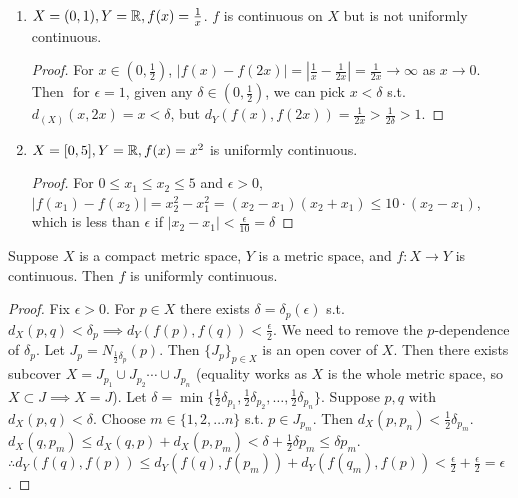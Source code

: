 \begin{example}
	\begin{enumerate}
		\item $X=(0,1), Y=\mathbb{R},f(x)=\frac{1}{x}$. $f$ is continuous on $X$ but is not uniformly continuous.
		      \begin{proof}
			      For $x \in (0,\frac{1}{2})$, $|f(x)-f(2x)|=|\frac{1}{x}-\frac{1}{2x}|=\frac{1}{2x}\to \infty$ as $x \to 0$. Then $\text{ for } \epsilon=1$, given any $\delta \in (0,\frac{1}{2})$, we can pick $x<\delta$ s.t. $d_(X)(x,2x)=x<\delta$, but $d_Y(f(x),f(2x))=\frac{1}{2x}>\frac{1}{2 \delta}>1$.
		      \end{proof}
		\item $X=[0,5], Y=\mathbb{R},f(x)=x^2$ is uniformly continuous.
		      \begin{proof}
			      For $0\le x_1\le x_2\le 5$ and $\epsilon>0$, $|f(x_1)-f(x_2)|=x_2^2-x_1^2=(x_2-x_1)(x_2+x_1)\le 10 \cdot (x_2-x_1)$, which is less than $\epsilon$ if $|x_2-x_1|<\frac{\epsilon}{10}=\delta$
		      \end{proof}
	\end{enumerate}
\end{example}

\begin{theorem}[19]
	Suppose $X$ is a compact metric space, $Y$ is a metric space, and $f:X\to Y$ is continuous. Then $f$ is uniformly continuous.
	\begin{proof}
		Fix $\epsilon>0$. For $p \in X$ there exists $\delta=\delta_p(\epsilon)$ s.t. $d_{X}(p,q)<\delta_{p}\implies d_Y(f(p),f(q))<\frac{\epsilon}{2}$.
		We need to remove the $p$-dependence of $\delta_p$.
		Let $J_{p}=N_{\frac{1}{2}\delta_{p}}(p)$. Then $\{ {J}_{p}\}_{p \in X}$ is an open cover of $X$.
		Then there exists subcover $X= J_{p_1} \cup J_{p_2}\cdots \cup J_{p_n}$ (equality works as $X$ is the whole metric space, so $X \subset J \implies X=J$).
		Let $\delta=\min\{\frac{1}{2}\delta_{p_1},\frac{1}{2}\delta_{p_2},\ldots ,\frac{1}{2}\delta_{p_n}\}$.
		Suppose $p,q$ with $d_{X}(p,q)<\delta$. Choose $m \in \{1,2,\ldots n\}$ s.t. $p \in J_{p_m}$. Then $d_{X}(p,p_{n})<\frac{1}{2}\delta_{p_{m}}$.
		$d_X(q,p_{m})\le d_X(q,p)+d_{X}(p,p_{m})<\delta+\frac{1}{2}\delta p_{m}\le \delta p_m$.
		$\therefore d_Y(f(q),f(p))\le d_Y(f(q),f(p_{m}))+d_Y(f(q_m),f(p))<\frac{\epsilon}{2}+\frac{\epsilon}{2}=\epsilon$.
	\end{proof}
\end{theorem}

